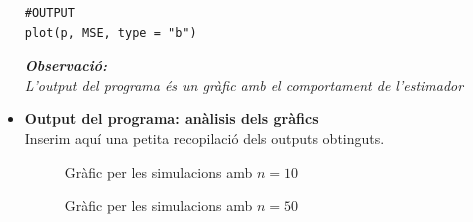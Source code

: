 \documentclass[12pt]{article}
\begin{document}
\begin{itemize}
\begin{verbatim}
#OUTPUT
plot(p, MSE, type = "b")
\end{verbatim}
\textbf{\textit{Observació:}}\\\textit{L'output del programa és un gràfic amb el comportament de l'estimador}
\newpage\item \textbf{Output del programa: anàlisis dels gràfics}\\
Inserim aquí una petita recopilació dels outputs obtinguts.

\begin{figure}[h]
\centering
{}
\caption{Gràfic per les simulacions amb $n=10$}
\label{f:t}
\end{figure}
\begin{figure}[h]
\centering
{}
\caption{Gràfic per les simulacions amb $n=50$}
\label{f:T}
\end{figure}

\end{itemize}
\end{document}
